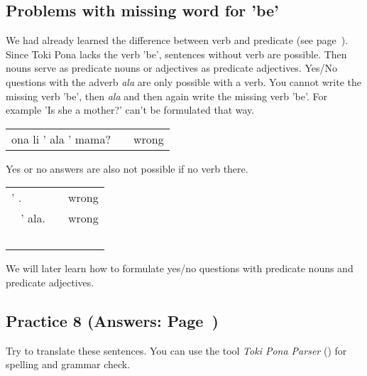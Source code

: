 \subsection*{Problems with missing word for 'be'}

We had already learned the difference between verb and predicate (see page~\pageref{'predicate'}). 
Since Toki Pona lacks the verb 'be', sentences without verb are possible. 
Then nouns serve as predicate nouns or adjectives as predicate adjectives. 
Yes/No questions with the adverb \textit{ala} are only possible with a verb. 
You cannot write the missing verb 'be', then \textit{ala} and then again write the missing verb 'be'.
For example 'Is she a mother?' can't be formulated that way. 

\begin{supertabular}{p{5,5cm}|ll}
ona li ' ala ' mama? && wrong \\ %
\end{supertabular} 

Yes or no answers are also not possible if no verb there. 

\begin{supertabular}{p{5,5cm}|ll}
' . && wrong \\\ %
' ala. && wrong \\\ %
\end{supertabular} 

We will later learn how to formulate yes/no questions with predicate nouns and predicate adjectives.
%
\newpage
\subsection*{Practice 8 (Answers: Page~\pageref{'negation_yes_no_questions'})}
%
Try to translate these sentences. 
You can use the tool \textit{Toki Pona Parser} (\cite{www:rowa:02}) for spelling and grammar check. 

